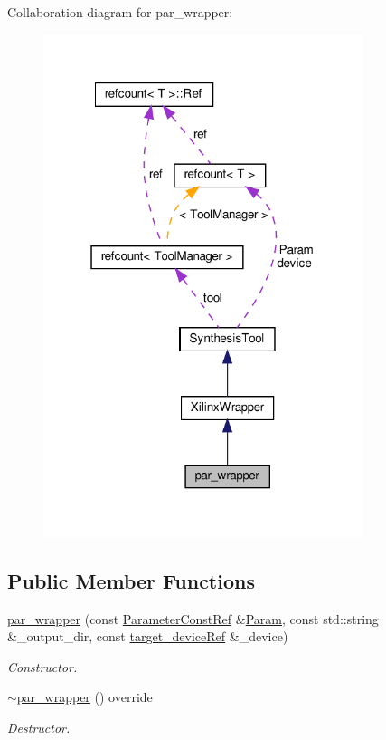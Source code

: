 Collaboration diagram for par\+\_\+wrapper\+:
\nopagebreak
\begin{figure}[H]
\begin{center}
\leavevmode
\includegraphics[width=265pt]{d8/dd3/classpar__wrapper__coll__graph}
\end{center}
\end{figure}
\subsection*{Public Member Functions}
\begin{DoxyCompactItemize}
\item 
\hyperlink{classpar__wrapper_abad8d571d4ce4a40e6812fa788f38613}{par\+\_\+wrapper} (const \hyperlink{Parameter_8hpp_a37841774a6fcb479b597fdf8955eb4ea}{Parameter\+Const\+Ref} \&\hyperlink{classSynthesisTool_a854ef102782ff4d069e1aa6d1a94d64e}{Param}, const std\+::string \&\+\_\+output\+\_\+dir, const \hyperlink{target__device_8hpp_acedb2b7a617e27e6354a8049fee44eda}{target\+\_\+device\+Ref} \&\+\_\+device)
\begin{DoxyCompactList}\small\item\em Constructor. \end{DoxyCompactList}\item 
\hyperlink{classpar__wrapper_a504b95aa213d10f0ea4db54c48c65601}{$\sim$par\+\_\+wrapper} () override
\begin{DoxyCompactList}\small\item\em Destructor. \end{DoxyCompactList}\end{DoxyCompactItemize}
